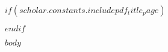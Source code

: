 \documentclass[14pt]{extarticle}
\begin{document}
$if(scholar.constants.includepdf_title_page)$

$endif$

$body$
\end{document}
